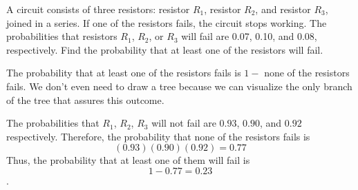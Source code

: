 \begin{example}
    A circuit consists of three resistors: resistor \( R_1 \), resistor \( R_2 \), and resistor \( R_3 \), joined in a series. If one of the resistors fails, the circuit stops working. The probabilities that resistors \( R_1 \), \( R_2 \), or \( R_3 \) will fail are 0.07, 0.10, and 0.08, respectively. Find the probability that at least one of the resistors will fail.
\end{example}
\begin{solution}
    The probability that at least one of the resistors fails is \( 1 - \) none of the resistors fails. We don't even need to draw a tree because we can visualize the only branch of the tree that assures this outcome.

    The probabilities that \( R_1 \), \( R_2 \), \( R_3 \) will not fail are \( 0.93 \), \( 0.90 \), and \( 0.92 \) respectively. Therefore, the probability that none of the resistors fails is
    \[ (0.93)(0.90)(0.92) = 0.77 \]
    Thus, the probability that at least one of them will fail is \[ 1 - 0.77 = 0.23 \].
\end{solution}
